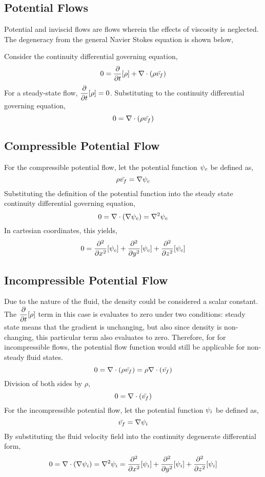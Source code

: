\documentclass[class=report, 12pt, crop=false]{standalone}
\begin{document}
\begin{center}
\chapter{Potential Flows}
\begin{comment}
\end{comment}
Potential and inviscid flows are flows wherein the effects of viscosity is neglected. The degeneracy from the general Navier Stokes equation is shown below,

Consider the continuity differential governing equation,
$$0 = \frac{\partial}{\partial t}[\rho] +  \nabla \cdot (\rho\bar{v_f})$$
For a steady-state flow, $\displaystyle{\frac{\partial}{\partial t}[\rho] = 0}$. Substituting to the continuity differential governing equation,
$$0 = \nabla \cdot (\rho\bar{v_f})$$
\section{Compressible Potential Flow}
\begin{comment}
\end{comment}
For the compressible potential flow, let the potential function $\displaystyle{\psi_c}$ be defined as,
$$\rho\bar{v_f} = \nabla \psi_c$$
Substituting the definition of the potential function into the steady state continuity differential governing equation,
$$0 = \nabla \cdot (\nabla \psi_c) = \nabla^2\psi_c$$
In cartesian coordinates, this yields,
$$0 = \frac{\partial^2}{\partial x^2}[\psi_c] + \frac{\partial^2}{\partial y^2}[\psi_c] + \frac{\partial^2}{\partial z^2}[\psi_c]$$
\section{Incompressible Potential Flow}
\begin{comment}
\end{comment}
Due to the nature of the fluid, the density could be considered a scalar constant. The $\displaystyle{\frac{\partial}{\partial t}[\rho]}$ term in this case is evaluates to zero under two conditions: steady state means that the gradient is unchanging, but also since density is non-changing, this particular term also evaluates to zero. Therefore, for for incompressible flows, the potential flow function would still be applicable for non-steady fluid states.
$$0 = \nabla \cdot (\rho\bar{v_f}) = \rho\nabla \cdot (\bar{v_f})$$
Division of both sides by $\rho$,
$$0 = \nabla \cdot (\bar{v_f})$$
For the incompressible potential flow, let the potential function $\displaystyle{\psi_i}$ be defined as,
$$\bar{v_f} = \nabla \psi_i$$
By substituting the fluid velocity field into the continuity degenerate differential form,
$$0 = \nabla \cdot (\nabla \psi_i) = \nabla^2\psi_i = \frac{\partial^2}{\partial x^2}[\psi_i] + \frac{\partial^2}{\partial y^2}[\psi_i] + \frac{\partial^2}{\partial z^2}[\psi_i]$$
\end{center}
\end{document}
